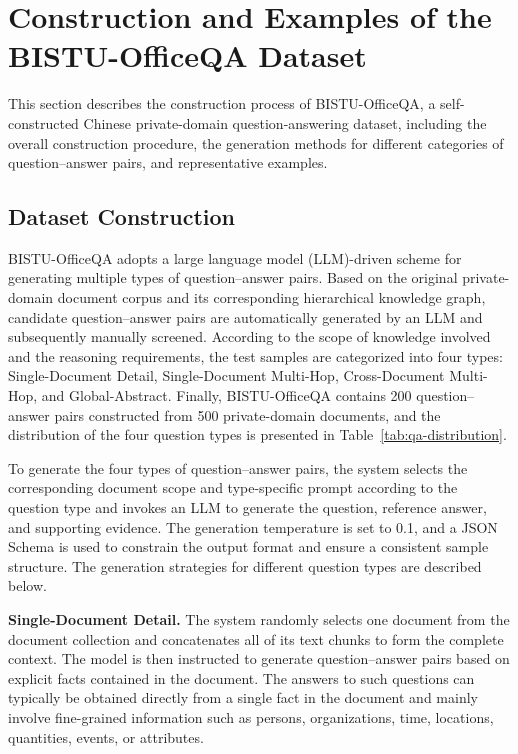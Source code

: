 \documentclass[preprint,12pt,authoryear]{elsarticle}
\begin{document}
\appendix
{}
\renewcommand{\thetable}{\Alph{section}.\arabic{table}}
\section{Construction and Examples of the BISTU-OfficeQA Dataset}
\label{app:dataset}

This section describes the construction process of BISTU-OfficeQA, a self-constructed Chinese private-domain question-answering dataset, including the overall construction procedure, the generation methods for different categories of question--answer pairs, and representative examples.

\subsection{Dataset Construction}

BISTU-OfficeQA adopts a large language model (LLM)-driven scheme for generating multiple types of question--answer pairs. Based on the original private-domain document corpus and its corresponding hierarchical knowledge graph, candidate question--answer pairs are automatically generated by an LLM and subsequently manually screened. According to the scope of knowledge involved and the reasoning requirements, the test samples are categorized into four types: Single-Document Detail, Single-Document Multi-Hop, Cross-Document Multi-Hop, and Global-Abstract. Finally, BISTU-OfficeQA contains 200 question--answer pairs constructed from 500 private-domain documents, and the distribution of the four question types is presented in Table~\ref{tab:qa-distribution}.




To generate the four types of question--answer pairs, the system selects the corresponding document scope and type-specific prompt according to the question type and invokes an LLM to generate the question, reference answer, and supporting evidence. The generation temperature is set to 0.1, and a JSON Schema is used to constrain the output format and ensure a consistent sample structure. The generation strategies for different question types are described below.

\textbf{Single-Document Detail.}
The system randomly selects one document from the document collection and concatenates all of its text chunks to form the complete context. The model is then instructed to generate question--answer pairs based on explicit facts contained in the document. The answers to such questions can typically be obtained directly from a single fact in the document and mainly involve fine-grained information such as persons, organizations, time, locations, quantities, events, or attributes.
\end{document}
